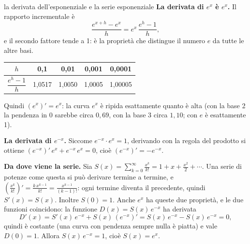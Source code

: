 \begin{richiamo}{la derivata dell'esponenziale e la serie esponenziale}
\textbf{La derivata di $e^x$ è $e^x$.} Il rapporto incrementale è
\[ \frac{e^{x+h} - e^x}{h} = e^x\, \frac{e^h - 1}{h} , \]
e il secondo fattore tende a 1: è la proprietà che distingue il numero $e$ da tutte le altre basi.
\begin{center}
\renewcommand{\arraystretch}{1.2}
\begin{tabular}{@{}c|cccc@{}}
  $h$ & 0,1 & 0,01 & 0,001 & 0,0001 \\ \hline
  $\dfrac{e^h - 1}{h}$ & 1,0517 & 1,0050 & 1,0005 & 1,00005
\end{tabular}
\end{center}
Quindi $(e^x)' = e^x$: la curva $e^x$ è ripida esattamente quanto è alta (con la base 2 la pendenza in 0 sarebbe circa
$0{,}69$, con la base 3 circa $1{,}10$; con $e$ è esattamente 1).

\textbf{La derivata di $e^{-x}$.} Siccome $e^{-x} \cdot e^{x} = 1$, derivando con la regola del prodotto si ottiene
$(e^{-x})'\,e^x + e^{-x}\,e^x = 0$, cioè $(e^{-x})' = -e^{-x}$.

\textbf{Da dove viene la serie.} Sia $S(x) = \sum_{k=0}^{\infty} \frac{x^k}{k!} = 1 + x + \frac{x^2}{2} + \cdots$.
Una serie di potenze come questa si può derivare termine a termine, e
$\left(\frac{x^k}{k!}\right)' = \frac{k\,x^{k-1}}{k!} = \frac{x^{k-1}}{(k-1)!}$: ogni termine diventa il precedente,
quindi $S'(x) = S(x)$. Inoltre $S(0) = 1$. Anche $e^x$ ha queste due proprietà, e le due funzioni coincidono: la
funzione $D(x) = S(x)\, e^{-x}$ ha derivata
\[ D'(x) = S'(x)\, e^{-x} + S(x)\, (e^{-x})' = S(x)\, e^{-x} - S(x)\, e^{-x} = 0 , \]
quindi è costante (una curva con pendenza sempre nulla è piatta) e vale $D(0) = 1$. Allora $S(x)\,e^{-x} = 1$, cioè
$S(x) = e^x$.
\end{richiamo}


